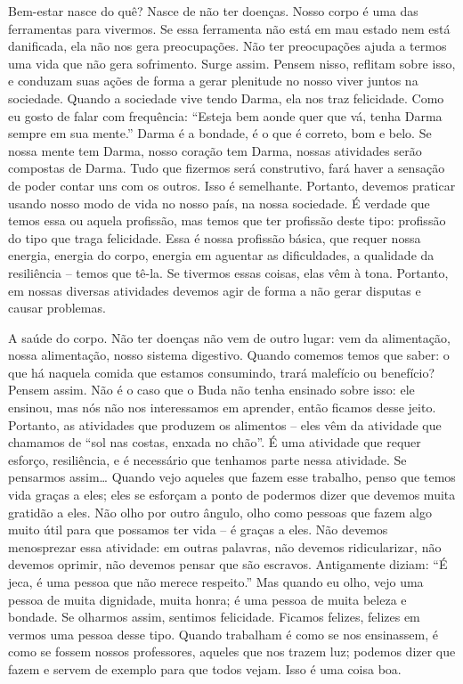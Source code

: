 Bem-estar nasce do quê? Nasce de não ter doenças. Nosso corpo é uma
das ferramentas para vivermos. Se essa ferramenta não está em mau
estado nem está danificada, ela não nos gera preocupações. Não ter
preocupações ajuda a termos uma vida que não gera sofrimento. Surge
assim. Pensem nisso, reflitam sobre isso, e conduzam suas ações de
forma a gerar plenitude no nosso viver juntos na sociedade. Quando a
sociedade vive tendo Darma, ela nos traz felicidade. Como eu gosto de
falar com frequência: “Esteja bem aonde quer que vá, tenha Darma sempre
em sua mente.” Darma é a bondade, é o que é correto, bom e belo. Se
nossa mente tem Darma, nosso coração tem Darma, nossas atividades serão
compostas de Darma. Tudo que fizermos será construtivo, fará haver a
sensação de poder contar uns com os outros. Isso é semelhante.
Portanto, devemos praticar usando nosso modo de vida no nosso país, na
nossa sociedade. É verdade que temos essa ou aquela profissão, mas
temos que ter profissão deste tipo: profissão do tipo que traga
felicidade. Essa é nossa profissão básica, que requer nossa energia,
energia do corpo, energia em aguentar as dificuldades, a qualidade da
resiliência – temos que tê-la. Se tivermos essas coisas, elas vêm à
tona. Portanto, em nossas diversas atividades devemos agir de forma a
não gerar disputas e causar problemas. 

A saúde do corpo. Não ter doenças não vem de outro lugar: vem da
alimentação, nossa alimentação, nosso sistema digestivo. Quando comemos
temos que saber: o que há naquela comida que estamos consumindo, trará
malefício ou benefício? Pensem assim. Não é o caso que o Buda não tenha
ensinado sobre isso: ele ensinou, mas nós não nos interessamos em
aprender, então ficamos desse jeito. Portanto, as atividades que
produzem os alimentos – eles vêm da atividade que chamamos de “sol nas
costas, enxada no chão”. É uma atividade que requer esforço,
resiliência, e é necessário que tenhamos parte nessa atividade. Se
pensarmos assim… Quando vejo aqueles que fazem esse trabalho, penso que
temos vida graças a eles; eles se esforçam a ponto de podermos dizer
que devemos muita gratidão a eles. Não olho por outro ângulo,
olho como pessoas que fazem algo muito útil
para que possamos ter vida – é graças a eles. Não devemos
menosprezar essa atividade: em outras
palavras, não devemos ridicularizar, não devemos oprimir, não devemos
pensar que são escravos. Antigamente diziam: “É jeca, é uma pessoa que
não merece respeito.” Mas quando eu olho, vejo uma pessoa de muita
dignidade, muita honra; é uma pessoa de muita beleza e bondade. Se
olharmos assim, sentimos felicidade. Ficamos felizes, felizes em vermos
uma pessoa desse tipo. Quando trabalham é como se nos ensinassem, é
como se fossem nossos professores, aqueles que nos
trazem luz; podemos dizer que fazem e servem
de exemplo para que todos vejam. Isso é uma coisa boa. 

